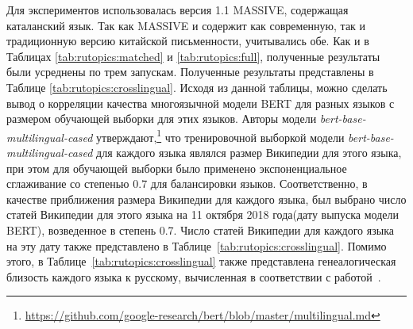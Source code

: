 {Для экспериментов использовалась версия 1.1 {MASSIVE}, содержащая каталанский язык. Так как {MASSIVE} и содержит как современную, так и традиционную версию китайской письменности, учитывались обе. Как и в Таблицах \ref{tab:rutopics:matched} и \ref{tab:rutopics:full}, полученные результаты были усреднены по трем запускам.
Полученные результаты представлены в Таблице \ref{tab:rutopics:crosslingual}. Исходя из данной таблицы, можно сделать вывод о корреляции качества многоязычной модели BERT для разных языков с размером обучающей выборки для этих языков. Авторы модели \textit{bert-base-multilingual-cased} утверждают,\footnote{\url{https://github.com/google-research/bert/blob/master/multilingual.md}} что тренировочной выборкой модели \textit{bert-base-multilingual-cased} для каждого языка являлся размер Википедии для этого языка, при этом для обучающей выборки было применено экспоненциальное сглаживание со степенью 0.7 для балансировки языков.
Соответственно, в качестве приближения размера Википедии для каждого языка, был выбрано число статей Википедии для этого языка на 11 октября 2018 года(дату выпуска модели BERT), возведенное в степень 0.7.  Число статей Википедии для каждого языка на эту дату также представлено в Таблице~\ref{tab:rutopics:crosslingual}. Помимо этого, в Таблице~\ref{tab:rutopics:crosslingual} также представлена генеалогическая близость каждого языка к русскому, вычисленная в соответствии с работой~\cite{lang_sim}. 

}
